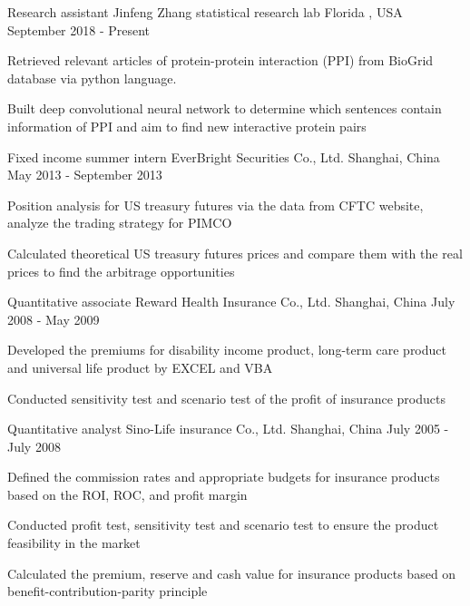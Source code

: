\begin{cventries}
    \cventry
      {Research assistant}
      {Jinfeng Zhang statistical research lab}
      {Florida , USA}
      {September 2018 - Present}
      {
        \begin{cvitems}
          \item {Retrieved relevant articles of protein-protein interaction (PPI) from BioGrid database via python language.
          }
          \item {Built deep convolutional neural network to determine which sentences contain information of PPI and aim to find new interactive protein pairs}
        \end{cvitems}
      }

  \cventry
    {Fixed income summer intern}
    {EverBright Securities Co., Ltd.}
    {Shanghai, China}
    {May 2013 - September 2013}
    {
      \begin{cvitems}
        \item {Position analysis for US treasury futures via the data from CFTC website, analyze the trading strategy for PIMCO
        }
        \item {Calculated theoretical US treasury futures prices and compare them with the real prices to find the arbitrage opportunities}
      \end{cvitems}
    }
  \cventry
    {Quantitative associate}
    {Reward Health Insurance Co., Ltd.}
    {Shanghai, China}
    {July 2008 - May 2009}
    {
      \begin{cvitems}
        \item {Developed the premiums for disability income product, long-term care product and universal life product by EXCEL and
        VBA}
        \item {Conducted sensitivity test and scenario test of the profit of insurance products}
      \end{cvitems}
    }
    
 \cventry
    {Quantitative analyst}
    {Sino-Life insurance Co., Ltd.}
    {Shanghai, China}
    {July 2005 - July 2008}
    {
      \begin{cvitems}
        \item {Defined the commission rates and appropriate budgets for insurance products based on the ROI, ROC, and profit margin}
        \item{
        Conducted profit test, sensitivity test and scenario test to ensure the product feasibility in the market}
        \item{Calculated the
                premium, reserve and cash value for insurance products based on benefit-contribution-parity principle}
      \end{cvitems}
    }    
\end{cventries}
